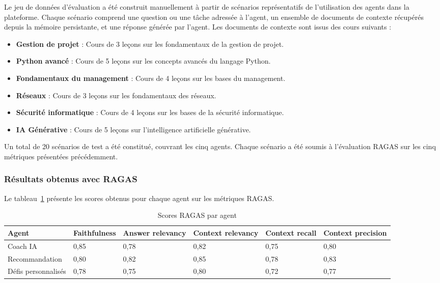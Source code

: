 Le jeu de données d'évaluation a été construit manuellement à partir de scénarios représentatifs de l'utilisation des agents dans la plateforme. Chaque scénario comprend une question ou une tâche adressée à l'agent, un ensemble de documents de contexte récupérés depuis la mémoire persistante, et une réponse générée par l'agent. Les documents de contexte sont issus des cours suivants :

\begin{itemize}
    \item \textbf{Gestion de projet} : Cours de 3 leçons sur les fondamentaux de la gestion de projet.
    \item \textbf{Python avancé} : Cours de 5 leçons sur les concepts avancés du langage Python.
    \item \textbf{Fondamentaux du management} : Cours de 4 leçons sur les bases du management.
    \item \textbf{Réseaux} : Cours de 3 leçons sur les fondamentaux des réseaux.
    \item \textbf{Sécurité informatique} : Cours de 4 leçons sur les bases de la sécurité informatique.
    \item \textbf{IA Générative} : Cours de 5 leçons sur l'intelligence artificielle générative.
\end{itemize}

Un total de 20 scénarios de test a été constitué, couvrant les cinq agents. Chaque scénario a été soumis à l'évaluation RAGAS sur les cinq métriques présentées précédemment.

\subsubsection{Résultats obtenus avec RAGAS}

Le tableau~\ref{tab:ch3_ragas_results} présente les scores obtenus pour chaque agent sur les métriques RAGAS.

\begin{table}[H]
    \centering
    \caption{Scores RAGAS par agent}
    \label{tab:ch3_ragas_results}
    \begin{tabularx}{\textwidth}{|p{3.5cm}|X|X|X|X|X|}
        \hline
        \textbf{Agent} & \textbf{Faithfulness} & \textbf{Answer relevancy} & \textbf{Context relevancy} & \textbf{Context recall} & \textbf{Context precision} \\
        \hline
        Coach IA & 0,85 & 0,78 & 0,82 & 0,75 & 0,80 \\
        \hline
        Recommandation & 0,80 & 0,82 & 0,85 & 0,78 & 0,83 \\
        \hline
        Défis personnalisés & 0,78 & 0,75 & 0,80 & 0,72 & 0,77 \\
        \hline
    \end{tabularx}
\end{table}

